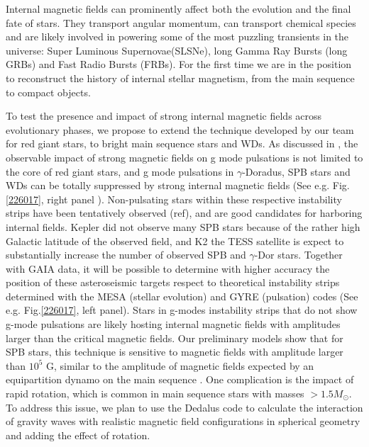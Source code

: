 Internal magnetic fields can prominently affect both the evolution and the final fate of stars. They transport angular momentum, can transport chemical species
and are likely involved in powering some of the most puzzling transients in the universe: Super Luminous Supernovae(SLSNe), long Gamma Ray Bursts (long GRBs) and Fast Radio Bursts (FRBs).
For the first time we are in the position to reconstruct the history of internal stellar magnetism, from the main sequence to compact objects.

To test the presence and impact of strong internal magnetic fields across evolutionary phases,
we propose to extend the technique developed by our team for red giant stars, to bright main sequence stars and WDs.
As discussed in \citet{Cantiello_2016}, the observable impact of strong magnetic fields on g mode pulsations is not limited to the core of red giant stars, and
 g mode pulsations in $\gamma$-Doradus, SPB stars and WDs can be totally suppressed by strong internal magnetic fields (See e.g. Fig.\ref{226017}, right panel ).
Non-pulsating stars within these respective instability strips have been tentatively observed (ref), and are good candidates for harboring internal fields.
Kepler did not observe many SPB stars because of the rather high Galactic latitude of the observed field, and K2  the TESS satellite is expect to substantially increase the number of observed SPB and $\gamma$-Dor stars.
Together with GAIA data, it will be possible to determine with higher accuracy the position of these asteroseismic targets respect to
theoretical instability strips determined with the MESA (stellar evolution) and GYRE (pulsation) codes (See e.g. Fig.\ref{226017}, left panel).
Stars in g-modes instability strips that do not show g-mode pulsations are likely hosting internal magnetic fields with amplitudes larger than the critical
magnetic fields. Our preliminary models show that for SPB stars, this technique is sensitive to magnetic fields with amplitude larger than $10^5$ G,
similar to the amplitude of magnetic fields expected by an equipartition dynamo on the main sequence \citep[See e.g.][]{Featherstone_2009,Augustson_2016}.
One complication is the impact of rapid rotation, which is common in main sequence stars with masses $> 1.5M_\odot$. To address this issue,
we plan to use the Dedalus code to calculate the interaction of gravity waves with realistic magnetic field configurations in spherical geometry \citep[e.g.][]{Braithwaite_2006} 
and adding the effect of rotation.
